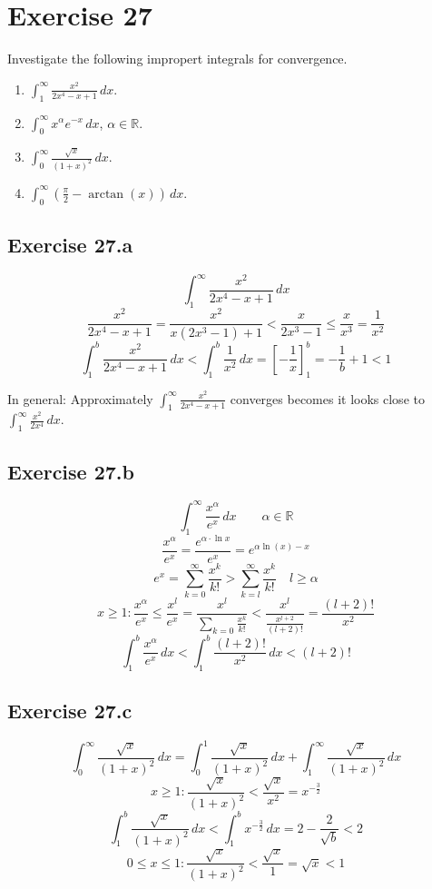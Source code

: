 \documentclass[a4paper]{article}
\theoremstyle{definition}
\begin{document}
\section{Exercise 27}
\begin{ex}
  Investigate the following impropert integrals for convergence.
  \begin{enumerate}
    \item $\int_1^\infty \frac{x^2}{2x^4 - x + 1} \, dx$.
    \item $\int_0^\infty x^\alpha e^{-x} \, dx$, $\alpha \in \mathbb R$.
    \item $\int_0^\infty \frac{\sqrt{x}}{(1 + x)^2} \, dx$.
    \item $\int_0^\infty \left(\frac{\pi}{2} - \arctan(x)\right) \, dx$.
  \end{enumerate}
\end{ex}

\subsection{Exercise 27.a}
\[ \int_1^\infty \frac{x^2}{2x^4 - x + 1} \, dx \]
\[ \frac{x^2}{2x^4 - x + 1} = \frac{x^2}{x (2x^3 - 1) + 1} < \frac{x}{2x^3 - 1} \leq \frac{x}{x^3} = \frac{1}{x^2} \]
\[ \int_1^b \frac{x^2}{2x^4 - x + 1} \, dx < \int_1^b \frac1{x^2} \, dx = \left[-\frac1x\right]_1^b = -\frac1b + 1 < 1 \]

In general: Approximately $\int_1^\infty \frac{x^2}{2x^4 - x + 1}$ converges becomes it looks close to $\int_1^\infty \frac{x^2}{2x^4} \, dx$.

\subsection{Exercise 27.b}
\[ \int_1^\infty \frac{x^\alpha}{e^x} \, dx \qquad \alpha \in \mathbb R \]
\[ \frac{x^\alpha}{e^x} = \frac{e^{\alpha \cdot \ln{x}}}{e^x} = e^{\alpha \ln(x) - x} \]
\[ e^x = \sum_{k=0}^\infty \frac{x^k}{k!} > \sum_{k=l}^\infty \frac{x^k}{k!} \quad l \geq \alpha \]
\[ x \geq 1: \frac{x^\alpha}{e^x} \leq \frac{x^l}{e^x} = \frac{x^l}{\sum_{k=0} \frac{x^k}{k!}} < \frac{x^l}{\frac{x^{l+2}}{(l+2)!}} = \frac{(l+2)!}{x^2} \]
\[ \int_1^b \frac{x^\alpha}{e^x} \, dx < \int_1^b \frac{(l+2)!}{x^2} \, dx < (l + 2)! \]

\subsection{Exercise 27.c}
\[ \int_0^\infty \frac{\sqrt{x}}{(1 + x)^2} \, dx = \int_0^1 \frac{\sqrt{x}}{(1 + x)^2} \, dx + \int_1^\infty \frac{\sqrt{x}}{(1 + x)^2} \, dx \]
\[ x \geq 1: \frac{\sqrt{x}}{(1 + x)^2} < \frac{\sqrt{x}}{x^2} = x^{-\frac32} \]
\[ \int_1^b \frac{\sqrt{x}}{(1 + x)^2} \, dx < \int_1^b x^{-\frac32} \, dx = 2 - \frac{2}{\sqrt{b}} < 2 \]
\[ 0 \leq x \leq 1: \frac{\sqrt{x}}{(1 + x)^2} < \frac{\sqrt{x}}{1} = \sqrt{x} < 1 \]
\end{document}
